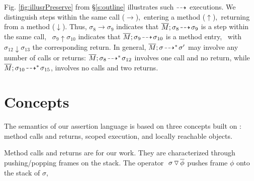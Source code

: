 {Fig. \ref{fig:illusrPreserve}  from \S \ref{s:outline} %
 illustrates  such  ${\dashrightarrow}$ executions. We distinguish
  steps within the same  call ($\rightarrow$),\   entering a method  ($\uparrow$),\    returning from a method  ($\downarrow$).
Thus,  $\sigma_8 \rightarrow \sigma_9$ indicates that  $\overline{M};\sigma_8\! \dashrightarrow\! {\sigma_9} $ is a step within the same call, 
\ $\sigma_9 \uparrow \sigma_{10}$ indicates that $\overline{M};\sigma_9\! \dashrightarrow\! {\sigma_{10}} $ is a method entry, \ with 
  $\sigma_{12} \downarrow \sigma_{13}$   the corresponding return. 
In general,  $\overline{M};\sigma\! \dashrightarrow^*\! {\sigma'}$ may involve  any number of  calls or returns: \eg
 $\overline{M};\sigma_8\! \dashrightarrow^*\! {\sigma_{12}}$ involves one call and no return,
while $\overline{M};\sigma_{10}\! \dashrightarrow^*\! {\sigma_{15}}$,   involves no calls and two returns.


%
 

\section{ Concepts}
\label{s:auxiliary}

{The semantics of our assertion language %
is based on three concepts built on} \LangOO: {method calls and returns, scoped execution}, and locally reachable objects.}

 
Method calls and returns are  for our work. 
They are characterized through pushing/popping   frames on the stack.  
The operator   $  \ {\sigma} \, {\triangledown}\, \overline{\phi} $ pushes 
frame $\phi$ onto the stack of $\sigma$,

